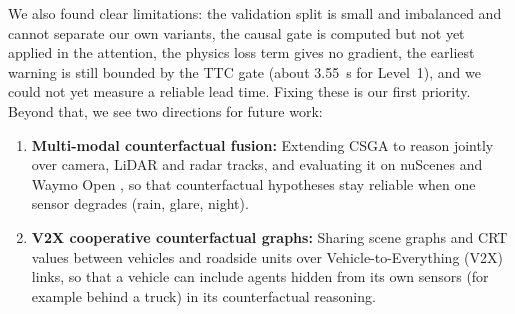 \documentclass[preprint,12pt]{elsarticle}
\begin{document}
We also found clear limitations: the validation split is small and imbalanced and cannot separate our own variants, the causal gate is computed but not yet applied in the attention, the physics loss term gives no gradient, the earliest warning is still bounded by the TTC gate (about 3.55~s for Level~1), and we could not yet measure a reliable lead time. Fixing these is our first priority. Beyond that, we see two directions for future work:
\begin{enumerate}
    \item \textbf{Multi-modal counterfactual fusion:} Extending CSGA to reason jointly over camera, LiDAR and radar tracks, and evaluating it on nuScenes \cite{caesar2020nuscenes} and Waymo Open \cite{sun2020waymo}, so that counterfactual hypotheses stay reliable when one sensor degrades (rain, glare, night).
    \item \textbf{V2X cooperative counterfactual graphs:} Sharing scene graphs and CRT values between vehicles and roadside units over Vehicle-to-Everything (V2X) links, so that a vehicle can include agents hidden from its own sensors (for example behind a truck) in its counterfactual reasoning.
\end{enumerate}


\end{document}
